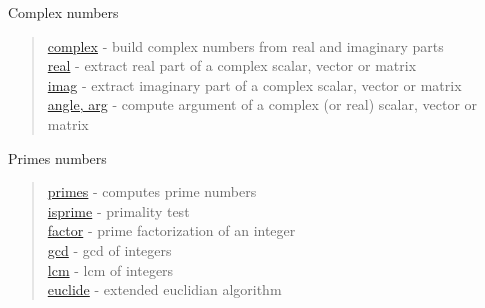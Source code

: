 Complex numbers

\begin{quote}
\noindent
\hyperlink{complex}{complex} - build complex numbers from real and imaginary parts\\
\hyperlink{real}{real} - extract real part of a complex scalar, vector or matrix\\
\hyperlink{imag}{imag} - extract imaginary part of a complex scalar, vector or matrix\\
\hyperlink{angle, arg}{angle, arg} - compute argument of a complex (or real) scalar, vector or matrix\\
\end{quote}

Primes numbers

\begin{quote}
\noindent
\hyperlink{primes}{primes} - computes prime numbers\\
\hyperlink{isprime}{isprime} - primality test\\
\hyperlink{factor}{factor} - prime factorization of an integer\\
\hyperlink{gcd}{gcd} - gcd of integers \\
\hyperlink{lcm}{lcm} - lcm of integers \\
\hyperlink{euclide}{euclide} - extended euclidian algorithm \\
\end{quote}




 
 
 
 
 
 
 
 



